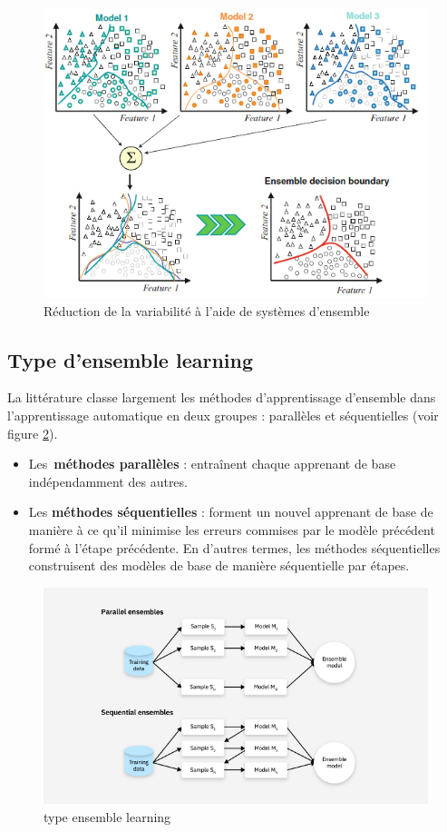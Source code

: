 \begin{figure}[h!]
	\centering
	\includegraphics[width=0.8\linewidth]{images/arr-ens}
	\caption{Réduction de la variabilité à l'aide de systèmes d'ensemble\cite{polikar2012ensemble}}
	\label{fig:arr-ens}
\end{figure}
\newpage
\subsection{Type d'ensemble learning}
La littérature classe largement les méthodes d'apprentissage d'ensemble dans l'apprentissage automatique en deux groupes : parallèles et séquentielles (voir figure \ref{fig:typeens}).
\begin{itemize}
	\item Les~\textbf{méthodes parallèles} : entraînent chaque apprenant de base indépendamment des autres.
	\item Les \textbf{méthodes séquentielles} : forment un nouvel apprenant de base de manière à ce qu'il minimise les erreurs commises par le modèle précédent formé à l'étape précédente. En d'autres termes, les méthodes séquentielles construisent des modèles de base de manière séquentielle par étapes.
\end{itemize}
\begin{figure}[h!]
	\centering
	\includegraphics[width=0.9\linewidth]{images/typeEns}
	\caption{type ensemble learning}
	\label{fig:typeens}
\end{figure}

